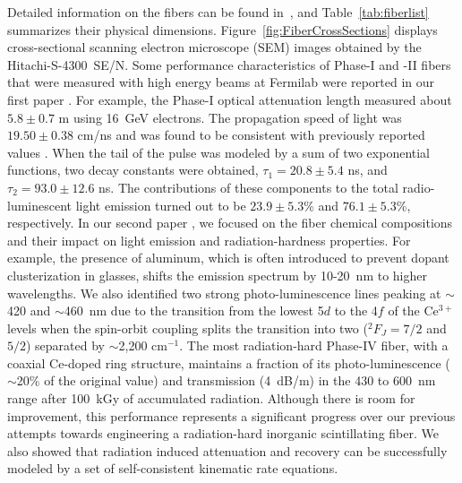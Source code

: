 \documentclass[a4paper,11pt]{article}
\begin{document}
Detailed information on the fibers can be found in~\cite{JINSTPaper}, and Table~\ref{tab:fiberlist} summarizes their physical dimensions.  Figure~\ref{fig:FiberCrossSections} displays cross-sectional scanning electron microscope (SEM) images obtained by the Hitachi-S-4300~SE/N.  Some performance characteristics of Phase-I and -II fibers that were measured with high energy beams at Fermilab were reported in our first paper \cite{JINSTPaper}.  For example, the Phase-I optical attenuation length measured about $5.8\pm0.7$ m using 16~GeV  electrons.  The propagation speed of light was $19.50\pm0.38$ cm/ns and was found to be consistent with previously reported values \cite{Goro,Akch97}.  When the tail of the pulse was modeled by a sum of two exponential functions, two decay constants were obtained, $\tau_1= 20.8\pm5.4$ ns, and $\tau_2= 93.0\pm12.6$ ns.  The contributions of these components to the total radio-luminescent light emission turned out to be $23.9\pm5.3$\% and $76.1\pm5.3$\%, respectively.  In our second paper \cite{JINSTPaper2}, we focused on the fiber chemical compositions and their impact on light emission and radiation-hardness properties.  For example, the presence of aluminum, which is often introduced to prevent dopant clusterization in glasses, shifts the emission spectrum by 10-20~nm to higher wavelengths.  We also identified two strong photo-luminescence lines peaking at $\sim$420 and $\sim$460~nm due to the transition from the lowest 5$d$ to the 4$f$ of the Ce$^{3+}$ levels when the spin-orbit coupling splits the transition into two ($^2F_{J}=7/2$ and $5/2$) separated by $\sim$2,200 cm$^{-1}$. The most radiation-hard Phase-IV fiber, with a coaxial Ce-doped ring structure, maintains a fraction of its photo-luminescence ($\sim$20\% of the original value) and transmission (4~dB/m) in the 430 to 600~nm range after 100~kGy of accumulated radiation. Although there is room for improvement, this performance represents a significant progress over our previous attempts towards engineering a radiation-hard inorganic scintillating  fiber.  We also showed that radiation induced attenuation and recovery can be successfully modeled by a set of self-consistent kinematic rate equations.
\end{document}
